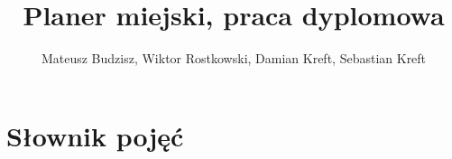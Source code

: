 \documentclass[oneside]{scrbook}
\title{Planer miejski, praca dyplomowa}
\author{Mateusz Budzisz, Wiktor Rostkowski, Damian Kreft, Sebastian Kreft}
\begin{document}
	\maketitle
	\tableofcontents

	\clearpage

	

	\mainmatter

	
	

	\chapter{Słownik pojęć}
	\label{ch:slownik-pojec}
	\printglossary[type=\acronymtype]
	\printglossary

	\backmatter
\end{document}
